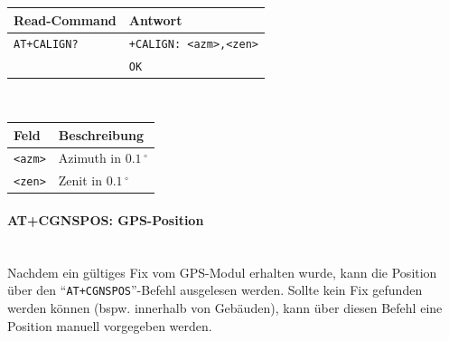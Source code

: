        \begin{table}[H]
            \centering
            \begin{tabular}{|p{}|p{}|}
                \hline
                \textbf{Read-Command} &\textbf{Antwort} \\
                \hline
                \texttt{AT+CALIGN?}  & \texttt{+CALIGN: <azm>,<zen>}\\
                & \texttt{OK}\\
                \hline
            \end{tabular}\\[3mm]
            \begin{tabular}{|p{}|p{}|}
                \hline
                \textbf{Feld}       & \textbf{Beschreibung}\\
                \hline
                \texttt{<azm>}      & Azimuth in $0.1\,^\circ$\\
                \texttt{<zen>}      & Zenit in $0.1\,^\circ$\\
                \hline
            \end{tabular}
        \end{table}
    
        \paragraph{AT+CGNSPOS: GPS-Position}\mbox{}\\
        Nachdem ein gültiges Fix vom GPS-Modul erhalten wurde, kann die Position über den ``\texttt{AT+CGNSPOS}''-Befehl ausgelesen werden. Sollte kein Fix gefunden werden können (bspw. innerhalb von Gebäuden), kann über diesen Befehl eine Position manuell vorgegeben werden.
        
